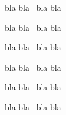 \documentclass{article}
\title{\packtested}
\author{moi}
\def\bla{{\tiny bla bla}}
\begin{document}
%
\maketitle{}
%
\bla{} \classeseconde\  \bla{}

\bla{} \classeterminale\ \bla{}

\bla{} \classepremiere\ \bla{}

\bla{} \stmg\  \bla{}

\bla{} \prgmInfo\  \bla{}

\bla{} \prgmAP\  \bla{}
%
\end{document}
